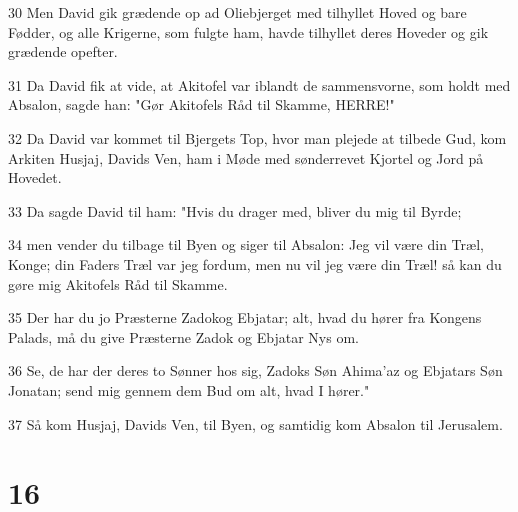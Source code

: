 \par 30 Men David gik grædende op ad Oliebjerget med tilhyllet Hoved og bare Fødder, og alle Krigerne, som fulgte ham, havde tilhyllet deres Hoveder og gik grædende opefter.
\par 31 Da David fik at vide, at Akitofel var iblandt de sammensvorne, som holdt med Absalon, sagde han: "Gør Akitofels Råd til Skamme, HERRE!"
\par 32 Da David var kommet til Bjergets Top, hvor man plejede at tilbede Gud, kom Arkiten Husjaj, Davids Ven, ham i Møde med sønderrevet Kjortel og Jord på Hovedet.
\par 33 Da sagde David til ham: "Hvis du drager med, bliver du mig til Byrde;
\par 34 men vender du tilbage til Byen og siger til Absalon: Jeg vil være din Træl, Konge; din Faders Træl var jeg fordum, men nu vil jeg være din Træl! så kan du gøre mig Akitofels Råd til Skamme.
\par 35 Der har du jo Præsterne Zadokog Ebjatar; alt, hvad du hører fra Kongens Palads, må du give Præsterne Zadok og Ebjatar Nys om.
\par 36 Se, de har der deres to Sønner hos sig, Zadoks Søn Ahima'az og Ebjatars Søn Jonatan; send mig gennem dem Bud om alt, hvad I hører."
\par 37 Så kom Husjaj, Davids Ven, til Byen, og samtidig kom Absalon til Jerusalem.

\chapter{16}

